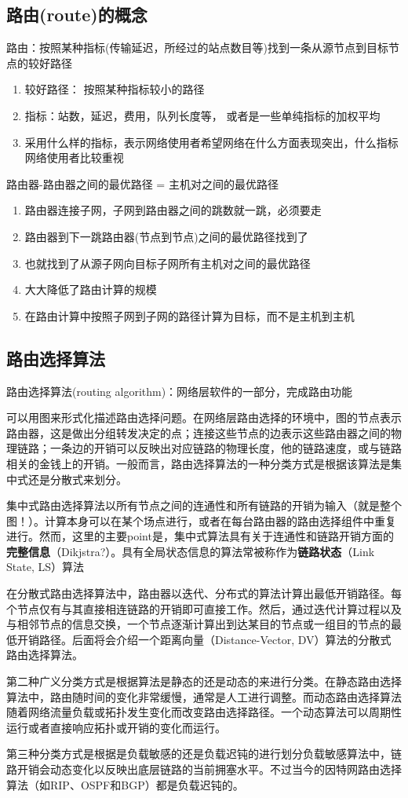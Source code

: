 \documentclass[]{report}
\newcommand{\quan}[1]{{\nmfont \symbol{#1}}}
\newcommand{\kk}[1]{\quan{\numexpr32+#1}}%
\begin{document}
	\subsection{路由(route)的概念}
	\kk{1} 路由：按照某种指标(传输延迟，所经过的站点数目等)找到一条从源节点到目标节点的较好路径
	\begin{enumerate}
		\item 较好路径： 按照某种指标较小的路径
		\item 指标：站数，延迟，费用，队列长度等， 或者是一些单纯指标的加权平均
		\item 采用什么样的指标，表示网络使用者希望网络在什么方面表现突出，什么指标网络使用者比较重视
	\end{enumerate}\par
	\kk{2} 路由器-路由器之间的最优路径 = 主机对之间的最优路径
	\begin{enumerate}
		\item 路由器连接子网，子网到路由器之间的跳数就一跳，必须要走
		\item 路由器到下一跳路由器(节点到节点)之间的最优路径找到了
		\item 也就找到了从源子网向目标子网所有主机对之间的最优路径
		\item 大大降低了路由计算的规模
		\item 在路由计算中按照子网到子网的路径计算为目标，而不是主机到主机
	\end{enumerate}\par
	\subsection{路由选择算法}
	路由选择算法(routing algorithm)：网络层软件的一部分，完成路由功能\par
	可以用图来形式化描述路由选择问题。在网络层路由选择的环境中，图的节点表示路由器，这是做出分组转发决定的点；连接这些节点的边表示这些路由器之间的物理链路；一条边的开销可以反映出对应链路的物理长度，他的链路速度，或与链路相关的金钱上的开销。一般而言，路由选择算法的一种分类方式是根据该算法是集中式还是分散式来划分。\par
	集中式路由选择算法以所有节点之间的连通性和所有链路的开销为输入（就是整个图！）。计算本身可以在某个场点进行，或者在每台路由器的路由选择组件中重复进行。然而，这里的主要point是，集中式算法具有关于连通性和链路开销方面的\textbf{完整信息}（{\color[HTML]{FF0000}Dikjstra?}）。具有全局状态信息的算法常被称作为\textbf{链路状态}（Link State, LS）算法\par
	在分散式路由选择算法中，路由器以迭代、分布式的算法计算出最低开销路径。每个节点仅有与其直接相连链路的开销即可直接工作。然后，通过迭代计算过程以及与相邻节点的信息交换，一个节点逐渐计算出到达某目的节点或一组目的节点的最低开销路径。后面将会介绍一个距离向量（Distance-Vector, DV）算法的分散式路由选择算法。\par
	第二种广义分类方式是根据算法是静态的还是动态的来进行分类。在静态路由选择算法中，路由随时间的变化非常缓慢，通常是人工进行调整。而动态路由选择算法随着网络流量负载或拓扑发生变化而改变路由选择路径。一个动态算法可以周期性运行或者直接响应拓扑或开销的变化而运行。\par
	第三种分类方式是根据是负载敏感的还是负载迟钝的进行划分负载敏感算法中，链路开销会动态变化以反映出底层链路的当前拥塞水平。不过当今的因特网路由选择算法（如RIP、OSPF和BGP）都是负载迟钝的。
\end{document}
